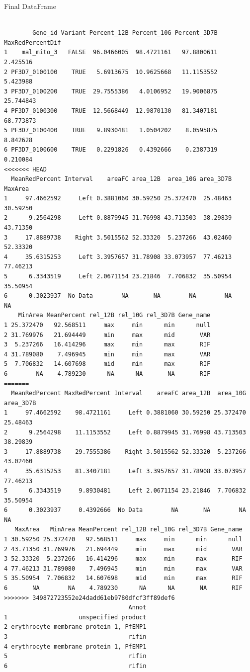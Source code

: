\documentclass[11pt]{article}
\begin{document}
Final DataFrame
\begin{verbatim}

        Gene_id Variant Percent_12B Percent_10G Percent_3D7B MaxRedPercentDif
1    mal_mito_3   FALSE  96.0466005  98.4721161   97.8800611         2.425516
2 PF3D7_0100100    TRUE   5.6913675  10.9625668   11.1153552         5.423988
3 PF3D7_0100200    TRUE  29.7555386   4.0106952   19.9006875        25.744843
4 PF3D7_0100300    TRUE  12.5668449  12.9870130   81.3407181        68.773873
5 PF3D7_0100400    TRUE   9.8930481   1.0504202    8.0595875         8.842628
6 PF3D7_0100600    TRUE   0.2291826   0.4392666    0.2387319         0.210084
<<<<<<< HEAD
  MeanRedPercent Interval    areaFC area_12B  area_10G area_3D7B  MaxArea
1     97.4662592     Left 0.3881060 30.59250 25.372470  25.48463 30.59250
2      9.2564298     Left 0.8879945 31.76998 43.713503  38.29839 43.71350
3     17.8889738    Right 3.5015562 52.33320  5.237266  43.02460 52.33320
4     35.6315253     Left 3.3957657 31.78908 33.073957  77.46213 77.46213
5      6.3343519     Left 2.0671154 23.21846  7.706832  35.50954 35.50954
6      0.3023937  No Data        NA       NA        NA        NA       NA
    MinArea MeanPercent rel_12B rel_10G rel_3D7B Gene_name
1 25.372470   92.568511     max     min      min      null
2 31.769976   21.694449     min     max      mid       VAR
3  5.237266   16.414296     max     min      max       RIF
4 31.789080    7.496945     min     min      max       VAR
5  7.706832   14.607698     mid     min      max       RIF
6        NA    4.789230      NA      NA       NA       RIF
=======
  MeanRedPercent MaxRedPercent Interval    areaFC area_12B  area_10G area_3D7B
1     97.4662592    98.4721161     Left 0.3881060 30.59250 25.372470  25.48463
2      9.2564298    11.1153552     Left 0.8879945 31.76998 43.713503  38.29839
3     17.8889738    29.7555386    Right 3.5015562 52.33320  5.237266  43.02460
4     35.6315253    81.3407181     Left 3.3957657 31.78908 33.073957  77.46213
5      6.3343519     9.8930481     Left 2.0671154 23.21846  7.706832  35.50954
6      0.3023937     0.4392666  No Data        NA       NA        NA        NA
   MaxArea   MinArea MeanPercent rel_12B rel_10G rel_3D7B Gene_name
1 30.59250 25.372470   92.568511     max     min      min      null
2 43.71350 31.769976   21.694449     min     max      mid       VAR
3 52.33320  5.237266   16.414296     max     min      max       RIF
4 77.46213 31.789080    7.496945     min     min      max       VAR
5 35.50954  7.706832   14.607698     mid     min      max       RIF
6       NA        NA    4.789230      NA      NA       NA       RIF
>>>>>>> 349872723552e24dadd61eb9780dfcf3ff89def6
                                   Annot
1                    unspecified product
2 erythrocyte membrane protein 1, PfEMP1
3                                  rifin
4 erythrocyte membrane protein 1, PfEMP1
5                                  rifin
6                                  rifin
\end{verbatim}
\end{document}
